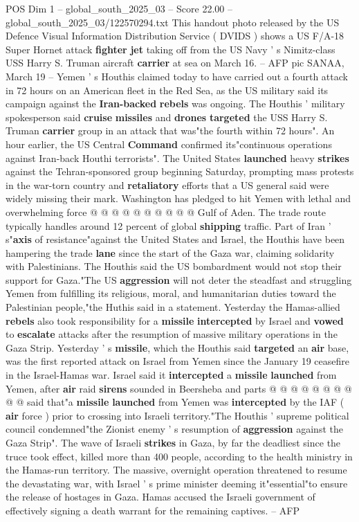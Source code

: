 \begin{textsample}{POS Dim 1 – global\_south\_2025\_03 – Score 22.00 – global\_south\_2025\_03/122570294.txt}  \label{ex:f1_pos_292}
This handout photo released by the US Defence Visual Information Distribution Service ( DVIDS ) shows a US F/A-18 Super Hornet attack \textbf{fighter} \textbf{jet} taking off from the US Navy ' s Nimitz-class USS Harry S.
Truman aircraft \textbf{carrier} at sea on March 16. -- AFP pic SANAA, March 19 -- Yemen ' s Houthis claimed today to have carried out a fourth attack in 72 hours on an American fleet in the Red Sea, as the US military said its campaign against the \textbf{Iran-backed} \textbf{rebels} was ongoing.
The Houthis ' military spokesperson said \textbf{cruise} \textbf{missiles} and \textbf{drones} \textbf{targeted} the USS Harry S.
Truman \textbf{carrier} group in an attack that was"the fourth within 72 hours".
An hour earlier, the US Central \textbf{Command} confirmed its"continuous operations against Iran-back Houthi terrorists".
The United States \textbf{launched} heavy \textbf{strikes} against the Tehran-sponsored group beginning Saturday, prompting mass protests in the war-torn country and \textbf{retaliatory} efforts that a US general said were widely missing their mark.
Washington has pledged to hit Yemen with lethal and overwhelming force @ @ @ @ @ @ @ @ @ @ Gulf of Aden.
The trade route typically handles around 12 percent of global \textbf{shipping} traffic.
Part of Iran ' s"\textbf{axis} of resistance"against the United States and Israel, the Houthis have been hampering the trade \textbf{lane} since the start of the Gaza war, claiming solidarity with Palestinians.
The Houthis said the US bombardment would not stop their support for Gaza."The US \textbf{aggression} will not deter the steadfast and struggling Yemen from fulfilling its religious, moral, and humanitarian duties toward the Palestinian people,"the Huthis said in a statement.
Yesterday the Hamas-allied \textbf{rebels} also took responsibility for a \textbf{missile} \textbf{intercepted} by Israel and \textbf{vowed} to \textbf{escalate} attacks after the resumption of massive military operations in the Gaza Strip.
Yesterday ' s \textbf{missile}, which the Houthis said \textbf{targeted} an \textbf{air} base, was the first reported attack on Israel from Yemen since the January 19 ceasefire in the Israel-Hamas war.
Israel said it \textbf{intercepted} a \textbf{missile} \textbf{launched} from Yemen, after \textbf{air} raid \textbf{sirens} sounded in Beersheba and parts @ @ @ @ @ @ @ @ @ @ said that"a \textbf{missile} \textbf{launched} from Yemen was \textbf{intercepted} by the IAF ( \textbf{air} force ) prior to crossing into Israeli territory."The Houthis ' supreme political council condemned"the Zionist enemy ' s resumption of \textbf{aggression} against the Gaza Strip".
The wave of Israeli \textbf{strikes} in Gaza, by far the deadliest since the truce took effect, killed more than 400 people, according to the health ministry in the Hamas-run territory.
The massive, overnight operation threatened to resume the devastating war, with Israel ' s prime minister deeming it"essential"to ensure the release of hostages in Gaza.
Hamas accused the Israeli government of effectively signing a death warrant for the remaining captives. -- AFP


\end{textsample}
